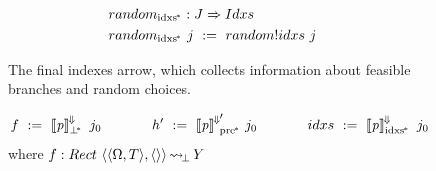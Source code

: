 \begin{figure}[!tb]
\begin{align*}
\begin{aligned}[t]
\begin{aligned}[t]
	\end{aligned} \\
\\[-6pt]
	&\begin{aligned}[t]
		&random_\mathrm{idxs^{\mspace{-2mu}*}} : J \Rightarrow Idxs \\
		&random_\mathrm{idxs^{\mspace{-2mu}*}}~j \ := \ random!idxs~j
	\end{aligned} \\
\end{aligned}
\end{align*}
\bottomhrule
\caption[Final indexes arrow definitions]{The final indexes arrow, which collects information about feasible branches and random choices.}
\label{fig:collecting-semantics-final}
\end{figure}

\begin{figure}[!tb]\centering
\smallmathfont
\begin{equation*}
	f\ :=\ \meaningofconv{\mathit{p}}_\pbot~j_0
\hspace{0.5in}
	h'\ :=\ {\meaningofconv{\mathit{p}}}'\ppre~j_0
\hspace{0.5in}
	idxs\ :=\ \meaningofconv{\mathit{p}}\pbi~j_0
\end{equation*}
where $f : Rect~\langle{\langle{\Omega,T}\rangle,\langle{}\rangle}\rangle \operatorname{\rightsquigarrow_{\mspace{-3mu}\bot}} Y$


\end{figure}
